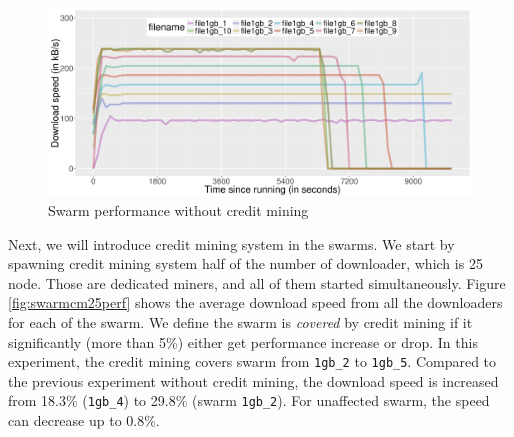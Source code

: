 \begin{figure}[h]
	\centering
	\includegraphics[width=\textwidth]{pics/results/swperf_n2.png}
	\caption{Swarm performance without credit mining}
	\label{fig:swarmnocmperf}
\end{figure}


Next, we will introduce credit mining system in the swarms. We start by spawning credit mining system half of the number of downloader, which is 25 node. Those are dedicated miners, and all of them started simultaneously. Figure \ref{fig:swarmcm25perf} shows the average download speed from all the downloaders for each of the swarm. We define the swarm is \textit{covered} by credit mining if it significantly (more than 5\%) either get performance increase or drop. In this experiment, the credit mining covers swarm from \texttt{1gb\_2} to \texttt{1gb\_5}. Compared to the previous experiment without credit mining, the download speed is increased from 18.3\% (\texttt{1gb\_4}) to 29.8\% (swarm \texttt{1gb\_2}). For unaffected swarm, the speed can decrease up to 0.8\%.

